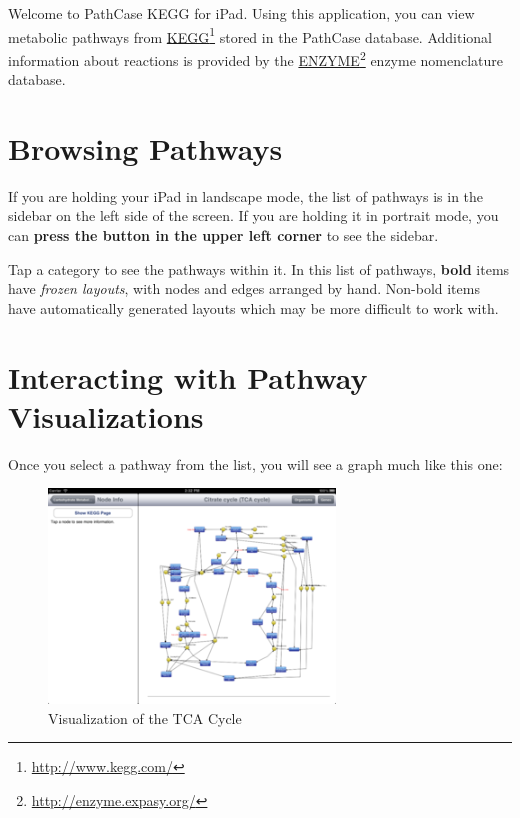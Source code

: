 Welcome to PathCase KEGG for iPad. Using this application, you can view
metabolic pathways from \href{http://www.kegg.com/}{KEGG}\footnote{\href{http://www.kegg.com/}{http:/\slash www.kegg.com\slash }} stored in the PathCase database. Additional
information about reactions is provided by the \href{http://enzyme.expasy.org/}{ENZYME}\footnote{\href{http://enzyme.expasy.org/}{http:/\slash enzyme.expasy.org\slash }} enzyme nomenclature
database.

\section{Browsing Pathways}
\label{browsingpathways}

If you are holding your iPad in landscape mode, the list of pathways is in the
sidebar on the left side of the screen. If you are holding it in portrait mode,
you can \textbf{press the button in the upper left corner} to see the sidebar.

Tap a category to see the pathways within it. In this list of pathways, \textbf{bold}
items have \emph{frozen layouts}, with nodes and edges arranged by hand. Non-bold
items have automatically generated layouts which may be more difficult to work
with.

\section{Interacting with Pathway Visualizations}
\label{interactingwithpathwayvisualizations}

Once you select a pathway from the list, you will see a graph much like this
one:

\begin{figure}[ht!]
\centering
\includegraphics[width=3in]{kegg_manual/pathway.png}
\caption{Visualization of the TCA Cycle}
\label{}
\end{figure}



